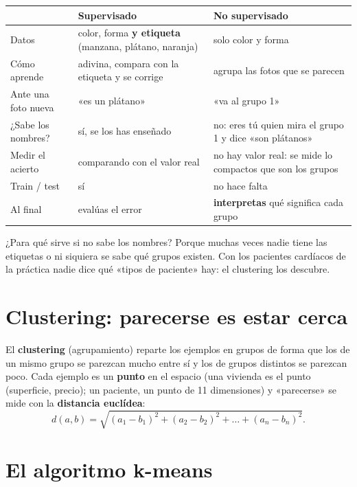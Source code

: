 \documentclass[a4paper,11pt]{article}
\begin{document}
\begin{center}
\begin{tabularx}{\linewidth}{@{}l Y Y@{}}
\toprule
 & \textbf{Supervisado} & \textbf{No supervisado} \\
\midrule
Datos & color, forma \textbf{y etiqueta} (manzana, plátano, naranja) & solo color y forma \\
Cómo aprende & adivina, compara con la etiqueta y se corrige & agrupa las fotos que se parecen \\
Ante una foto nueva & «es un plátano» & «va al grupo 1» \\
¿Sabe los nombres? & sí, se los has enseñado & no: eres tú quien mira el grupo 1 y dice «son plátanos» \\
Medir el acierto & comparando con el valor real & no hay valor real: se mide lo compactos que son los grupos \\
Train / test & sí & no hace falta \\
Al final & evalúas el error & \textbf{interpretas} qué significa cada grupo \\
\bottomrule
\end{tabularx}
\end{center}

¿Para qué sirve si no sabe los nombres? Porque muchas veces nadie tiene las etiquetas o ni siquiera se sabe qué
grupos existen. Con los pacientes cardíacos de la práctica nadie dice qué «tipos de paciente» hay: el clustering los descubre.

\section{Clustering: parecerse es estar cerca}

El \textbf{clustering} (agrupamiento) reparte los ejemplos en grupos de forma que los de un mismo grupo se parezcan
mucho entre sí y los de grupos distintos se parezcan poco. Cada ejemplo es un \textbf{punto} en el espacio
(una vivienda es el punto (superficie, precio); un paciente, un punto de 11 dimensiones) y «parecerse» se mide con
la \textbf{distancia euclídea}:
\[
d(a,b)=\sqrt{(a_1-b_1)^2+(a_2-b_2)^2+\dots+(a_n-b_n)^2}.
\]

\section{El algoritmo k-means}
\end{document}
